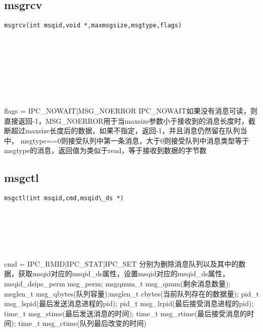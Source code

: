 \documentclass[10pt,a4paper]{article}
\begin{document}
\subsection{msgrcv}
\begin{spacing}{2.0}
\lstset{language=C,numbers=none}
\begin{lstlisting}
msgrcv(int msqid,void *,maxmsgsize,msgtype,flags)
\end{lstlisting}
{\large\color[rgb]{0.2,0.4,0.6}{msqid:}} \\
{\large\color[rgb]{0.2,0.4,0.6}{*:}} \\
{\large\color[rgb]{0.2,0.4,0.6}{maxmsgsize:}} \\
{\large\color[rgb]{0.2,0.4,0.6}{msgtype:}} \\
{\large\color[rgb]{0.2,0.4,0.6}{flags:}}
\paragraph{ \ \ }flags = IPC\_NOWAIT|MSG\_NOERROR IPC\_NOWAIT如果没有消息可读，则直接返回-1，MSG\_NOERROR用于当maxsize参数小于接收到的消息长度时，截断超过maxsize长度后的数据，如果不指定，返回-1，并且消息仍然留在队列当中， msgtype==0则接受队列中第一条消息，大于0则接受队列中消息类型等于msgtype的消息，返回值为类似于read，等于接收到数据的字节数
\end{spacing}

\subsection{msgctl}
\begin{spacing}{2.0}
\lstset{language=C,numbers=none}
\begin{lstlisting}
msgctl(int msqid,cmd,msqid\_ds *)
\end{lstlisting}
{\large\color[rgb]{0.2,0.4,0.6}{msqid:}} \\
{\large\color[rgb]{0.2,0.4,0.6}{cmd:}} \\
{\large\color[rgb]{0.2,0.4,0.6}{*:}}
\paragraph{ \ \ }cmd = IPC\_RMID|IPC\_STAT|IPC\_SET 分别为删除消息队列以及其中的数据，获取msqid对应的msqid\_ds属性，设置msqid对应的msqid\_ds属性，msqid\_ds{ipc\_perm msg\_perm; msgqnum\_t msg\_qnum(剩余消息数量); msglen\_t msg\_qbytes(队列容量);msglen\_t cbytes(当前队列存在的数据量); pid\_t msg\_lspid(最后发送消息进程的pid); pid\_t msg\_lrpid(最后接受消息进程的pid); time\_t msg\_stime(最后发送消息的时间); time\_t msg\_rtime(最后接受消息的时间); time\_t msg\_ctime(队列最后改变的时间)}
\end{spacing}
\end{document}
